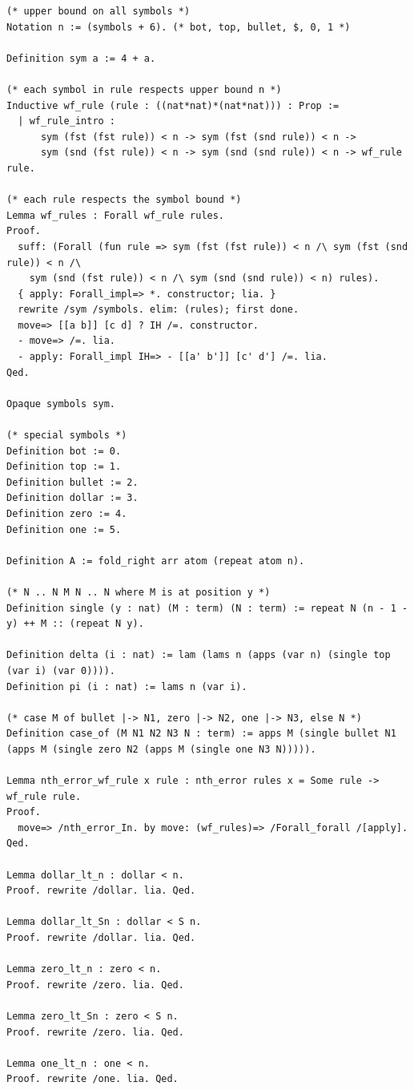 \documentclass[10pt,a4paper]{amsart}
\begin{document}
\begin{lstlisting}
(* upper bound on all symbols *)
Notation n := (symbols + 6). (* bot, top, bullet, $, 0, 1 *)

Definition sym a := 4 + a.

(* each symbol in rule respects upper bound n *)
Inductive wf_rule (rule : ((nat*nat)*(nat*nat))) : Prop :=
  | wf_rule_intro : 
      sym (fst (fst rule)) < n -> sym (fst (snd rule)) < n ->
      sym (snd (fst rule)) < n -> sym (snd (snd rule)) < n -> wf_rule rule.

(* each rule respects the symbol bound *)
Lemma wf_rules : Forall wf_rule rules.
Proof.
  suff: (Forall (fun rule => sym (fst (fst rule)) < n /\ sym (fst (snd rule)) < n /\
    sym (snd (fst rule)) < n /\ sym (snd (snd rule)) < n) rules).
  { apply: Forall_impl=> *. constructor; lia. }
  rewrite /sym /symbols. elim: (rules); first done.
  move=> [[a b]] [c d] ? IH /=. constructor.
  - move=> /=. lia.
  - apply: Forall_impl IH=> - [[a' b']] [c' d'] /=. lia.
Qed.

Opaque symbols sym.

(* special symbols *)
Definition bot := 0.
Definition top := 1.
Definition bullet := 2.
Definition dollar := 3.
Definition zero := 4.
Definition one := 5.

Definition A := fold_right arr atom (repeat atom n).

(* N .. N M N .. N where M is at position y *)
Definition single (y : nat) (M : term) (N : term) := repeat N (n - 1 - y) ++ M :: (repeat N y).

Definition delta (i : nat) := lam (lams n (apps (var n) (single top (var i) (var 0)))).
Definition pi (i : nat) := lams n (var i).

(* case M of bullet |-> N1, zero |-> N2, one |-> N3, else N *)
Definition case_of (M N1 N2 N3 N : term) := apps M (single bullet N1 (apps M (single zero N2 (apps M (single one N3 N))))).

Lemma nth_error_wf_rule x rule : nth_error rules x = Some rule -> wf_rule rule.
Proof.
  move=> /nth_error_In. by move: (wf_rules)=> /Forall_forall /[apply].
Qed.

Lemma dollar_lt_n : dollar < n.
Proof. rewrite /dollar. lia. Qed.

Lemma dollar_lt_Sn : dollar < S n.
Proof. rewrite /dollar. lia. Qed.

Lemma zero_lt_n : zero < n.
Proof. rewrite /zero. lia. Qed.

Lemma zero_lt_Sn : zero < S n.
Proof. rewrite /zero. lia. Qed.

Lemma one_lt_n : one < n.
Proof. rewrite /one. lia. Qed.


\end{lstlisting}
\end{document}
